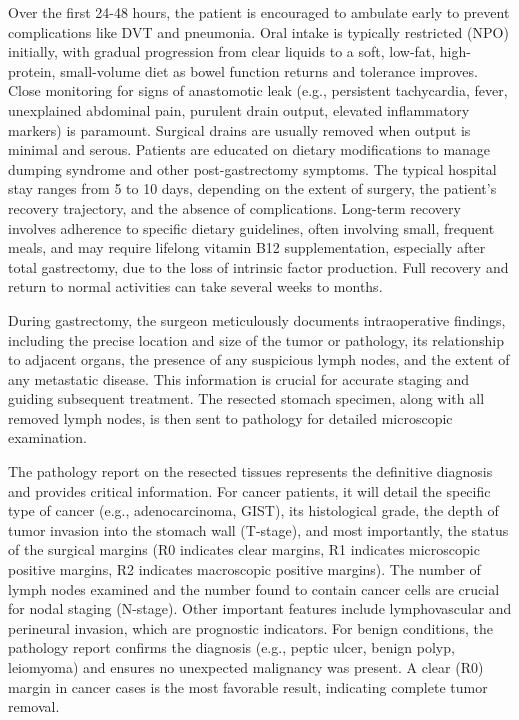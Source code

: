 Over the first 24-48 hours, the patient is encouraged to ambulate early to prevent complications like DVT and pneumonia. Oral intake is typically restricted (NPO) initially, with gradual progression from clear liquids to a soft, low-fat, high-protein, small-volume diet as bowel function returns and tolerance improves. Close monitoring for signs of anastomotic leak (e.g., persistent tachycardia, fever, unexplained abdominal pain, purulent drain output, elevated inflammatory markers) is paramount. Surgical drains are usually removed when output is minimal and serous. Patients are educated on dietary modifications to manage dumping syndrome and other post-gastrectomy symptoms. The typical hospital stay ranges from 5 to 10 days, depending on the extent of surgery, the patient's recovery trajectory, and the absence of complications. Long-term recovery involves adherence to specific dietary guidelines, often involving small, frequent meals, and may require lifelong vitamin B12 supplementation, especially after total gastrectomy, due to the loss of intrinsic factor production. Full recovery and return to normal activities can take several weeks to months.

During gastrectomy, the surgeon meticulously documents intraoperative findings, including the precise location and size of the tumor or pathology, its relationship to adjacent organs, the presence of any suspicious lymph nodes, and the extent of any metastatic disease. This information is crucial for accurate staging and guiding subsequent treatment. The resected stomach specimen, along with all removed lymph nodes, is then sent to pathology for detailed microscopic examination.

The pathology report on the resected tissues represents the definitive diagnosis and provides critical information. For cancer patients, it will detail the specific type of cancer (e.g., adenocarcinoma, GIST), its histological grade, the depth of tumor invasion into the stomach wall (T-stage), and most importantly, the status of the surgical margins (R0 indicates clear margins, R1 indicates microscopic positive margins, R2 indicates macroscopic positive margins). The number of lymph nodes examined and the number found to contain cancer cells are crucial for nodal staging (N-stage). Other important features include lymphovascular and perineural invasion, which are prognostic indicators. For benign conditions, the pathology report confirms the diagnosis (e.g., peptic ulcer, benign polyp, leiomyoma) and ensures no unexpected malignancy was present. A clear (R0) margin in cancer cases is the most favorable result, indicating complete tumor removal.

